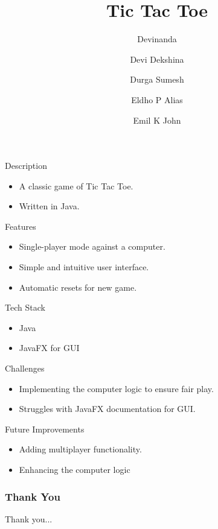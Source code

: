 \documentclass[10pt,aspectratio=169]{beamer}
\title{Tic Tac Toe}
\date{}
\author{
  Devinanda \and
  Devi Dekshina \and
  Durga Sumesh\and
  Eldho P Alias\and
  Emil K John
}
\begin{document}
\maketitle

\begin{frame}{Description}
  \begin{itemize}
    \item A classic game of Tic Tac Toe.
    \item Written in Java.
  \end{itemize}
\end{frame}

\begin{frame}{Features}
  \begin{itemize}
    \item Single-player mode against a computer.
    \item Simple and intuitive user interface.
    \item Automatic resets for new game.
  \end{itemize}
\end{frame}

\begin{frame}{Tech Stack}
  \begin{itemize}
    \item Java
    \item JavaFX for GUI
  \end{itemize}
\end{frame}

\begin{frame}{Challenges}
  \begin{itemize}
    \item Implementing the computer logic to ensure fair play.
    \item Struggles with JavaFX documentation for GUI.
  \end{itemize}
\end{frame}

\begin{frame}{Future Improvements}
  \begin{itemize}
    \item Adding multiplayer functionality.
    \item Enhancing the computer logic
  \end{itemize}
\end{frame}

\begin{frame}
    \frametitle{Thank You}
    \centering
    \Huge
    Thank you...
\end{frame}
\end{document}

